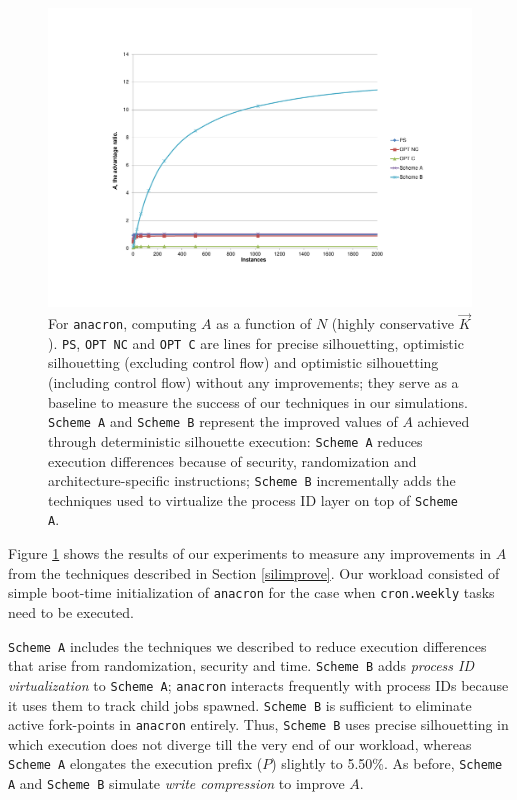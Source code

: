 \begin{figure}[h]
  \center
  \includegraphics[scale=0.80, trim=5cm 3cm 0cm 3cm]{anacron-1.pdf}
  \caption[For \texttt{anacron}, $A$ as a function of $N$ (highly conservative $\vec K$)]%
          {
            For \texttt{anacron}, computing $A$ as a function of $N$ (highly conservative $\vec K$).\newline
            \texttt{PS}, \texttt{OPT NC} and \texttt{OPT C} are lines for precise silhouetting, optimistic 
            silhouetting (excluding control flow) and optimistic silhouetting
            (including control flow) without any improvements; they
            serve as a baseline to measure the success of our techniques
            in our simulations. \texttt{Scheme A} and \texttt{Scheme B} represent the improved values of $A$
            achieved through deterministic silhouette execution:
            \texttt{Scheme A} reduces execution differences because
            of security, randomization and architecture-specific instructions;
            \texttt{Scheme B} incrementally adds the techniques used to
            virtualize the process ID layer on top of \texttt{Scheme A}.            
          }
  \label{anacron1}
\end{figure}

\newpage
\noindent Figure \ref{anacron1} shows the results of our experiments
to measure any improvements in $A$ from the techniques described in Section \ref{silimprove}.
Our workload consisted of simple boot-time initialization of \texttt{anacron}
for the case when \texttt{cron.weekly} tasks need to be executed.

\texttt{Scheme A} includes the techniques we described to reduce
execution differences that arise from randomization, security and time.
\texttt{Scheme B} adds {\em process ID virtualization}
to \texttt{Scheme A}; \texttt{anacron} interacts
frequently with process IDs because it uses them to track
child jobs spawned. \texttt{Scheme B} is sufficient to eliminate active fork-points in \texttt{anacron}
entirely. Thus, \texttt{Scheme B} uses precise silhouetting
in which execution does not diverge till the very end of our workload,
whereas \texttt{Scheme A} elongates the execution prefix ($P$) slightly
to 5.50\%. As before, \texttt{Scheme A} and \texttt{Scheme B} simulate {\em write compression}
to improve $A$. 


